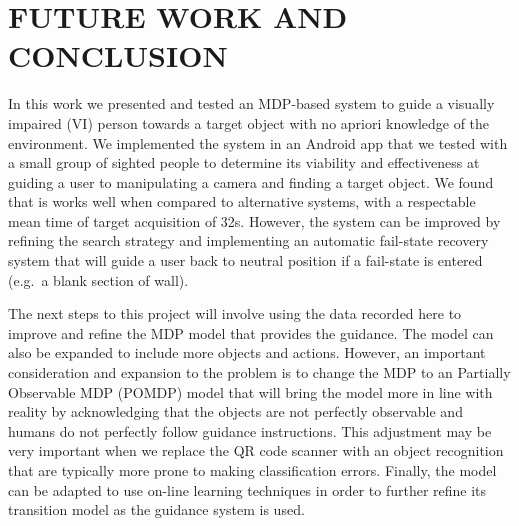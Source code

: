 \documentclass[a4paper, twoside]{article}
\begin{document}
\section{\uppercase{Future Work and Conclusion}}\label{sec:conclusion}

\noindent In this work we presented and tested an MDP-based system to guide a visually impaired (VI) person towards a target object with no apriori knowledge of the environment. We implemented the system in an Android app that we tested with a small group of sighted people to determine its viability and effectiveness at guiding a user to manipulating a camera and finding a target object. We found that is works well when compared to alternative systems, with a respectable mean time of target acquisition of 32s. However, the system can be improved by refining the search strategy and implementing an automatic fail-state recovery system that will guide a user back to neutral position if a fail-state is entered (e.g.\ a blank section of wall). 

The next steps to this project will involve using the data recorded here to improve and refine the MDP model that provides the guidance. The model can also be expanded to include more objects and actions. However, an important consideration and expansion to the problem is to change the MDP to an Partially Observable MDP (POMDP) model that will bring the model more in line with reality by acknowledging that the objects are not perfectly observable and humans do not perfectly follow guidance instructions. This adjustment may be very important when we replace the QR code scanner with an object recognition that are typically more prone to making classification errors. Finally, the model can be adapted to use on-line learning techniques in order to further refine its transition model as the guidance system is used.  

\clearpage


\end{document}
